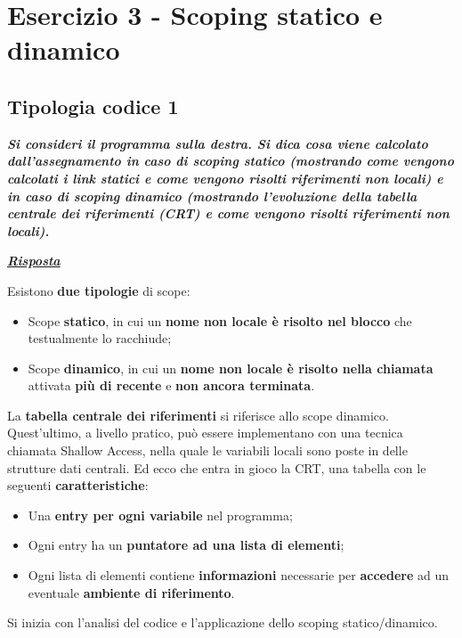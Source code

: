 \documentclass[a4paper]{article}
\begin{document}
	\section{Esercizio 3 - Scoping statico e dinamico}
	
	\subsection{Tipologia codice 1}
	
	\textcolor{Red3}{\textbf{\emph{Si consideri il programma sulla destra. Si dica cosa viene calcolato dall'assegnamento in caso di scoping statico (mostrando come vengono calcolati i link statici e come vengono risolti riferimenti non locali) e in caso di scoping dinamico (mostrando l'evoluzione della tabella centrale dei riferimenti (CRT) e come vengono risolti riferimenti non locali).}}}
	
	
	\noindent
	\textcolor{Green4}{\textbf{\emph{\underline{Risposta}}}}\newline
	
	\noindent
	Esistono \textbf{due tipologie} di scope:
	\begin{itemize}
		\item Scope \textbf{statico}, in cui un \textbf{nome non locale è risolto nel blocco} che testualmente lo racchiude;
		\item Scope \textbf{dinamico}, in cui un \textbf{nome non locale è risolto nella chiamata} attivata \textbf{più di recente} e \textbf{non ancora terminata}.
	\end{itemize}
	La \textbf{tabella centrale dei riferimenti} si riferisce allo scope dinamico. Quest'ultimo, a livello pratico, può essere implementano con una tecnica chiamata Shallow Access, nella quale le variabili locali sono poste in delle strutture dati centrali. Ed ecco che entra in gioco la CRT, una tabella con le seguenti \textbf{caratteristiche}:
	\begin{itemize}
		\item Una \textbf{entry per ogni variabile} nel programma;
		\item Ogni entry ha un \textbf{puntatore ad una lista di elementi};
		\item Ogni lista di elementi contiene \textbf{informazioni} necessarie per \textbf{accedere} ad un eventuale \textbf{ambiente di riferimento}.
	\end{itemize}
	Si inizia con l'analisi del codice e l'applicazione dello scoping statico/dinamico.\newpage
	
\end{document}
